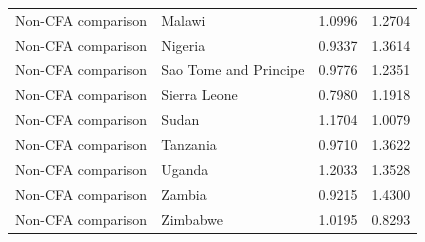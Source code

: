 \begin{table}
\begin{tabular}[t]{llrr}
Non-CFA comparison & Malawi & 1.0996 & 1.2704\\
Non-CFA comparison & Nigeria & 0.9337 & 1.3614\\
Non-CFA comparison & Sao Tome and Principe & 0.9776 & 1.2351\\
Non-CFA comparison & Sierra Leone & 0.7980 & 1.1918\\
\addlinespace
Non-CFA comparison & Sudan & 1.1704 & 1.0079\\
Non-CFA comparison & Tanzania & 0.9710 & 1.3622\\
Non-CFA comparison & Uganda & 1.2033 & 1.3528\\
Non-CFA comparison & Zambia & 0.9215 & 1.4300\\
Non-CFA comparison & Zimbabwe & 1.0195 & 0.8293\\
\bottomrule
\end{tabular}
\end{table}